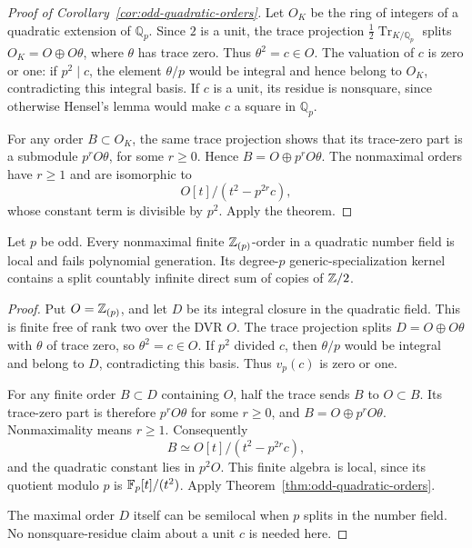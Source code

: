 \begin{proof}[Proof of Corollary~\ref{cor:odd-quadratic-orders}]
Let $O_K$ be the ring of integers of a quadratic extension of
$\mathbb Q_p$.  Since $2$ is a unit, the trace projection
$\frac12\operatorname{Tr}_{K/\mathbb Q_p}$ splits
$O_K=O\oplus O\theta$, where $\theta$ has trace zero.
Thus $\theta^2=c\in O$.  The valuation of $c$ is zero or one:
if $p^2\mid c$, the element $\theta/p$ would be integral and hence
belong to $O_K$, contradicting this integral basis.
If $c$ is a unit, its residue is nonsquare, since otherwise Hensel's
lemma would make $c$ a square in $\mathbb Q_p$.

For any order $B\subset O_K$, the same trace projection shows that
its trace-zero part is a submodule $p^rO\theta$, for some $r\ge0$.
Hence $B=O\oplus p^rO\theta$.  The nonmaximal orders have $r\ge1$
and are isomorphic to
\[
 O[t]/(t^2-p^{2r}c),
\]
whose constant term is divisible by $p^2$.  Apply the theorem.
\end{proof}

\begin{corollary}\label{cor:localized-odd-quadratic-orders}
Let $p$ be odd.  Every nonmaximal finite $\mathbb Z_{(p)}$-order in a
quadratic number field is local and fails polynomial generation.
Its degree-$p$ generic-specialization kernel contains a split
countably infinite direct sum of copies of $\mathbb Z/2$.
\end{corollary}

\begin{proof}
Put $O=\mathbb Z_{(p)}$, and let $D$ be its integral closure in the quadratic
field.  This is finite free of rank two over the DVR $O$.
The trace projection splits $D=O\oplus O\theta$ with $\theta$ of
trace zero, so $\theta^2=c\in O$.  If $p^2$ divided $c$, then
$\theta/p$ would be integral and belong to $D$, contradicting this
basis.  Thus $v_p(c)$ is zero or one.

For any finite order $B\subset D$ containing $O$, half the trace
sends $B$ to $O\subset B$.  Its trace-zero part is therefore
$p^rO\theta$ for some $r\ge0$, and
$B=O\oplus p^rO\theta$.  Nonmaximality means $r\ge1$.
Consequently
\[
 B\simeq O[t]/(t^2-p^{2r}c),
\]
and the quadratic constant lies in $p^2O$.  This finite algebra is
local, since its quotient modulo $p$ is $\mathbb F_p[t]/(t^2)$.
Apply Theorem~\ref{thm:odd-quadratic-orders}.

The maximal order $D$ itself can be semilocal when $p$ splits in
the number field.  No nonsquare-residue claim about a unit $c$ is
needed here.
\end{proof}

